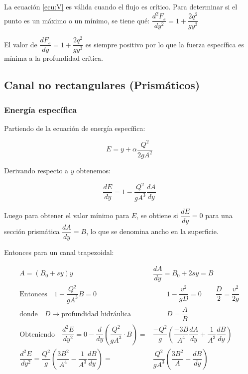 \documentclass[11pt, oneside]{article}
\begin{document}
La ecuación \ref{ecu:V} es válida cuando el flujo es crítico. Para determinar si el punto es un máximo o un mínimo, se tiene qué: $\dfrac{d^{2}F_{s}}{dy^{2}}=1+\dfrac{2q^{2}}{gy^{3}}$ \vspace{1ex}

El valor de $\dfrac{dF_{s}}{dy}=1+\dfrac{2q^{2}}{gy^{3}}$ es siempre positivo por lo que la fuerza específica es mínima a la profundidad crítica.

\subsection{Canal no rectangulares (Prismáticos)}

\subsubsection{Energía específica}

Partiendo de la ecuación de energía específica:

\begin{equation}
    E=y+\alpha \dfrac{Q^{2}}{2gA^{2}}
\end{equation}

Derivando respecto a $y$ obtenemos:

\begin{equation}
    \dfrac{dE}{dy}=1-\dfrac{Q^{2}}{gA^{3}}\dfrac{dA}{dy}
\end{equation}

Luego para obtener el valor mínimo para $E$, se obtiene si $\dfrac{dE}{dy}=0$ para una sección prismática $\dfrac{dA}{dy}=B$, lo que se denomina ancho en la superficie.

Entonces para un canal trapezoidal:

\begin{equation}
    \begin{aligned}  
        A=(B_0+sy)y \qquad &\dfrac{dA}{dy}=B_0+2sy=B\\
        \text{Entonces} \quad 1-\dfrac{Q^{2}}{gA^{3}}B=0& \qquad 1-\dfrac{v^{2}}{gD}=0 \qquad \dfrac{D}{2}=\dfrac{v^{2}}{2g}\\
        \text{donde} \quad D\rightarrow \text{profundidad hidráulica}& \qquad D=\dfrac{A}{B}\\
        \text{Obteniendo} \quad \dfrac{d^{2}E}{dy^{2}}=0-\dfrac{d}{dy}\left(\dfrac{Q^{2}}{gA^{3}}\cdot B\right)=&\dfrac{-Q^{2}}{g}\left(\dfrac{-3B}{A^{4}}\dfrac{dA}{dy}+\dfrac{1}{A^{3}}\dfrac{dB}{dy}\right)\\
        \dfrac{d^{2}E}{dy^{2}}=\dfrac{Q^{2}}{g}\left(\dfrac{3B^{2}}{A^{4}}-\dfrac{1}{A^{3}}\dfrac{dB}{dy}\right)=&\dfrac{Q^{2}}{gA^{3}}\left(\dfrac{3B^{2}}{A}-\dfrac{dB}{dy}\right)
    \end{aligned}
\end{equation}
\end{document}
